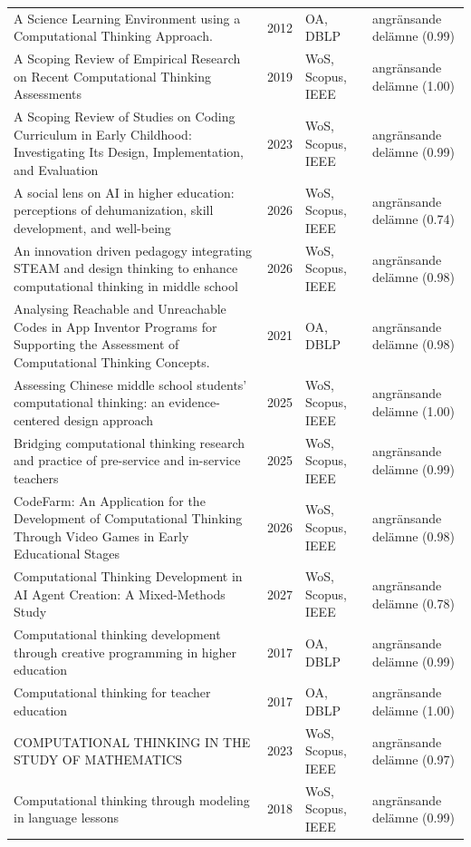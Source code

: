 \begin{longtable}{@{}%
  >{\raggedright\arraybackslash}p{}c%
  >{\raggedright\arraybackslash}p{}%
  >{\raggedright\arraybackslash}p{}@{}}
A Science Learning Environment using a Computational Thinking Approach. & 2012 & OA, DBLP & angränsande delämne (0.99) \\
A Scoping Review of Empirical Research on Recent Computational Thinking Assessments & 2019 & WoS, Scopus, IEEE & angränsande delämne (1.00) \\
A Scoping Review of Studies on Coding Curriculum in Early Childhood: Investigating Its Design, Implementation, and Evaluation & 2023 & WoS, Scopus, IEEE & angränsande delämne (0.99) \\
A social lens on AI in higher education: perceptions of dehumanization, skill development, and well-being & 2026 & WoS, Scopus, IEEE & angränsande delämne (0.74) \\
An innovation driven pedagogy integrating STEAM and design thinking to enhance computational thinking in middle school & 2026 & WoS, Scopus, IEEE & angränsande delämne (0.98) \\
Analysing Reachable and Unreachable Codes in App Inventor Programs for Supporting the Assessment of Computational Thinking Concepts. & 2021 & OA, DBLP & angränsande delämne (0.98) \\
Assessing Chinese middle school students' computational thinking: an evidence-centered design approach & 2025 & WoS, Scopus, IEEE & angränsande delämne (1.00) \\
Bridging computational thinking research and practice of pre-service and in-service teachers & 2025 & WoS, Scopus, IEEE & angränsande delämne (0.99) \\
CodeFarm: An Application for the Development of Computational Thinking Through Video Games in Early Educational Stages & 2026 & WoS, Scopus, IEEE & angränsande delämne (0.98) \\
Computational Thinking Development in AI Agent Creation: A Mixed-Methods Study & 2027 & WoS, Scopus, IEEE & angränsande delämne (0.78) \\
Computational thinking development through creative programming in higher education & 2017 & OA, DBLP & angränsande delämne (0.99) \\
Computational thinking for teacher education & 2017 & OA, DBLP & angränsande delämne (1.00) \\
COMPUTATIONAL THINKING IN THE STUDY OF MATHEMATICS & 2023 & WoS, Scopus, IEEE & angränsande delämne (0.97) \\
Computational thinking through modeling in language lessons & 2018 & WoS, Scopus, IEEE & angränsande delämne (0.99) \\

\end{longtable}
